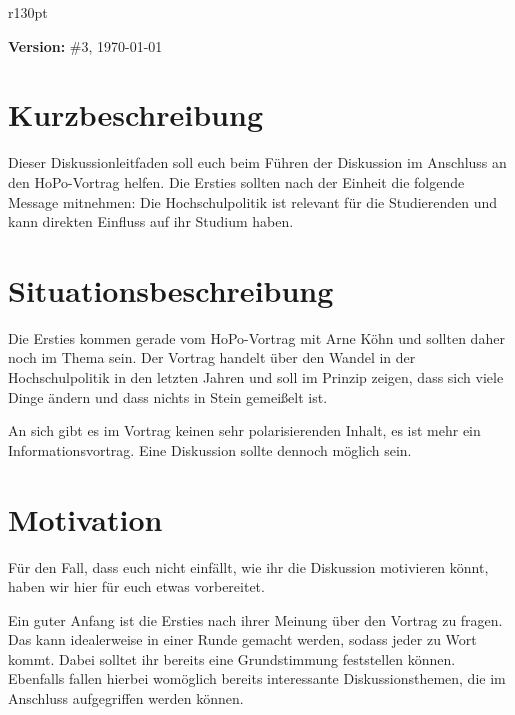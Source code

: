 \documentclass[a4paper,11pt]{scrartcl} %
\begin{document}
\thispagestyle{firststyle}

\begin{wrapfigure}{r}{130pt}
\vspace{-45pt}
  \fbox{
  \begin{minipage}{140pt}
   \tableofcontents
  \end{minipage}
  }
\end{wrapfigure}

\textbf{Version:} \#3, \today %

\section{Kurzbeschreibung} %
    Dieser Diskussionleitfaden soll euch beim Führen der Diskussion
    im Anschluss an den HoPo-Vortrag helfen. Die Ersties sollten nach 
    der Einheit die folgende Message mitnehmen:
    Die Hochschulpolitik ist relevant für die Studierenden und kann
    direkten Einfluss auf ihr Studium haben.
  
 
\section{Situationsbeschreibung} 
Die Ersties kommen gerade vom HoPo-Vortrag mit Arne Köhn und sollten daher noch im Thema sein.
Der Vortrag handelt über den Wandel in der Hochschulpolitik in den letzten Jahren und soll
im Prinzip zeigen, dass sich viele Dinge ändern und dass nichts in Stein gemeißelt ist.

An sich gibt es im Vortrag keinen sehr polarisierenden Inhalt, es ist mehr ein Informationsvortrag.
Eine Diskussion sollte dennoch möglich sein.

\section{Motivation}

Für den Fall, dass euch nicht einfällt, wie ihr die Diskussion motivieren könnt, haben wir hier für
euch etwas vorbereitet.

Ein guter Anfang ist die Ersties nach ihrer Meinung über den Vortrag zu fragen. Das kann idealerweise
in einer Runde gemacht werden, sodass jeder zu Wort kommt. Dabei solltet ihr bereits eine Grundstimmung
feststellen können. Ebenfalls fallen hierbei womöglich bereits interessante Diskussionsthemen, die im
Anschluss aufgegriffen werden können.
\end{document}
